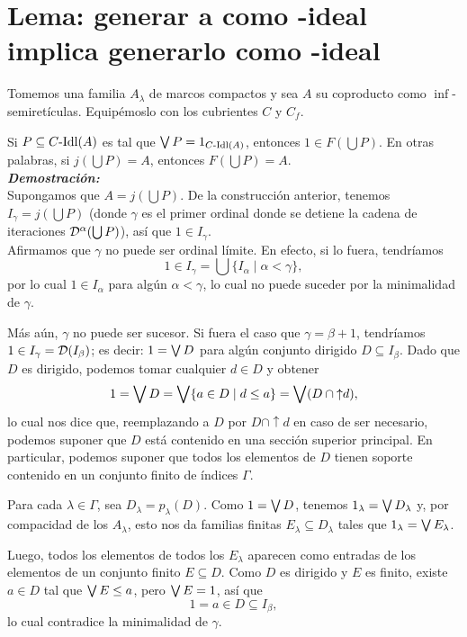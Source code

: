 \section{Lema: generar a  como -ideal implica generarlo como -ideal}
    Tomemos una familia $A_\lambda$ de marcos compactos
    y sea $A$ su coproducto como $\inf$-semiretículas.
    Equipémoslo con los cubrientes $C$ y $C_f$.
    
    Si $P\subseteq C\text{-}\mathrm{Idl}(A)$ es tal que $\bigvee P=1_{C\text{-}\mathrm{Idl}(A)}$,
    entonces $1\in F(\bigcup P)$.
    En otras palabras, si
    $j(\bigcup P)=A$, entonces $F(\bigcup P)=A$.
    \\
    \textbf{\emph{Demostración:}} \\
    Supongamos que $A=j(\bigcup P)$.
    De la construcción anterior, tenemos
    $I_\gamma=j(\bigcup P)$ (donde $\gamma$ es el primer
    ordinal donde se detiene la cadena de iteraciones
    $\mathcal D^\alpha(\bigcup P)$),
    así que $1\in I_\gamma$. \\
    Afirmamos que $\gamma$ no puede ser ordinal límite.
    En efecto, si lo fuera, tendríamos
    \[
        1 \in I_\gamma = \bigcup\{I_\alpha \mid \alpha<\gamma\}
    ,\]
    por lo cual $1\in I_\alpha$ para algún $\alpha<\gamma$, lo
    cual no puede suceder por la minimalidad de $\gamma$.

    Más aún, $\gamma$ no puede ser sucesor.
    Si fuera el caso que $\gamma=\beta+1$, tendríamos
    $1\in I_\gamma = \mathcal D(I_\beta)$;
    es decir: $1=\bigvee D$ para algún conjunto dirigido
    $D\subseteq I_\beta$.
    Dado que $D$ es dirigido, podemos tomar cualquier
    $d\in D$ y obtener
    \[
        1
        = \bigvee D
        = \bigvee\{a\in D\mid d\leq a\}
        = \bigvee(D\cap{\uparrow}d)
    ,\]
    lo cual nos dice que,
    reemplazando a $D$ por $D\cap{\uparrow}d$ en
    caso de ser necesario,
    podemos suponer que $D$ está contenido en una
    sección superior principal.
    En particular, podemos suponer que todos los elementos
    de $D$ tienen soporte contenido en
    un conjunto finito de índices $\Gamma$.

    Para cada $\lambda\in\Gamma$, sea $D_\lambda=p_\lambda(D)$.
    Como $1=\bigvee D$, tenemos $1_\lambda=\bigvee D_\lambda$ y,
    por compacidad de los $A_\lambda$, esto nos da familias finitas
    $E_\lambda\subseteq D_\lambda$ tales que
    $1_\lambda=\bigvee E_\lambda$.
    
    Luego, todos los elementos de todos los $E_\lambda$ aparecen
    como entradas de los elementos de un conjunto finito
    $E\subseteq D$.
    Como $D$ es dirigido y $E$ es finito,
    existe $a\in D$ tal que $\bigvee E\leq a$,
    pero $\bigvee E=1$, así que
    \[
        1 = a \in D\subseteq I_\beta
    ,\]
    lo cual contradice la minimalidad de $\gamma$.
    
